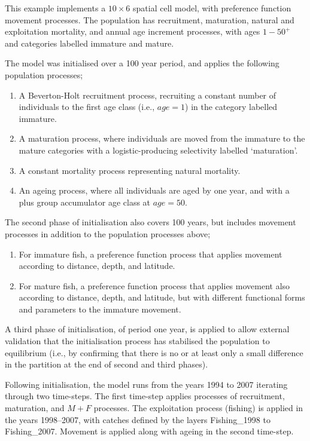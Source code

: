 This example implements a $ 10 \times 6 $ spatial cell model, with preference function movement processes. The population has recruitment, maturation, natural and exploitation mortality, and annual age increment processes, with ages $1-50^{+}$ and categories labelled immature and mature. 

The model was initialised over a 100 year period, and applies the following population processes;

\begin{enumerate}
\item A Beverton-Holt recruitment process, recruiting a constant number of individuals to the first age class (i.e., $age=1$) in the category labelled immature.
\item A maturation process, where individuals are moved from the immature to the mature categories with a logistic-producing selectivity labelled `maturation'.
\item A constant mortality process representing natural mortality. 
\item An ageing process, where all individuals are aged by one year, and with a plus group accumulator age class at $age=50$.
\end{enumerate}

The second phase of initialisation also covers 100 years, but includes movement processes in addition to the population processes above;
\begin{enumerate}
\item For immature fish, a preference function process that applies movement according to distance, depth, and latitude.
\item For mature fish, a preference function process that applies movement also according to distance, depth, and latitude, but with different functional forms and parameters to the immature movement.
\end{enumerate}

A third phase of initialisation, of period one year, is applied to allow external validation that the initialisation process has stabilised the population to equilibrium (i.e., by confirming that there is no or at least only a small difference in the partition at the end of second and third phases).

Following initialisation, the model runs from the years 1994 to 2007 iterating through two time-steps. The first time-step applies processes of recruitment, maturation, and  $ M + F $ processes. The exploitation process (fishing) is applied in the years 1998--2007, with catches defined by the layers Fishing\_1998 to Fishing\_2007. Movement is applied along with ageing in the second time-step.

